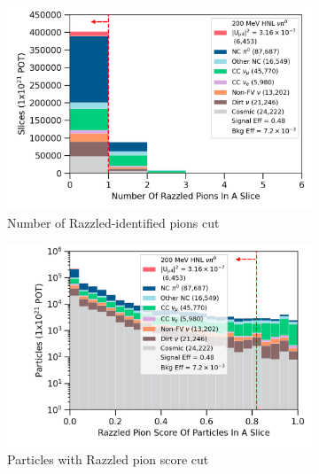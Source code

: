 \begin{figure}[h!]
        \begin{subfigure}[b]{0.495\textwidth}   
            \centering 
            \includegraphics[width=\textwidth]{nrazzled_pion_precut}
            \caption{Number of Razzled-identified pions cut}%
            \label{fig:nrazzled_pion_full}
        \end{subfigure}
        \hfill
        \begin{subfigure}[b]{0.495\textwidth}   
            \centering 
            \includegraphics[width=\textwidth]{razzled_pion_score_precut}
            \caption{Particles with Razzled pion score cut}%
            \label{fig:razzled_pion_score_full}
        \end{subfigure}
        \hfill
	\centering
        \begin{subfigure}[b]{0.495\textwidth}   
            \centering 

\end{subfigure}
\end{figure}
